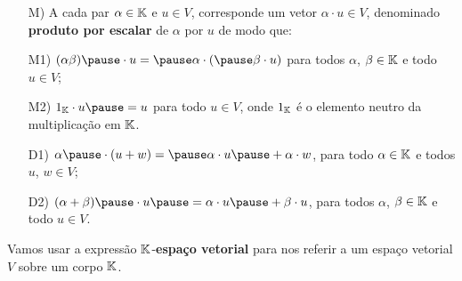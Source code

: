 \documentclass{beamer}
\begin{document}
\begin{frame}
  \begin{definicao}
    \begin{itemize}
      \item[M)] A cada par $\alpha \in \mathbb{K}$ \pause e $u \in V$, \pause corresponde um vetor $\alpha \cdot u \in V$, \pause denominado \textbf{produto por escalar} \pause de $\alpha$ por $u$ de modo que:\pause

        \vspace{.3cm}

      \item[M1)] $(\alpha\beta)\pause \cdot u = \pause \alpha\cdot (\pause \beta\cdot u)$ \pause para todos $\alpha$, $\beta \in \mathbb{K}$ \pause e todo $u \in V$;\pause

        \vspace{.3cm}

      \item[M2)] $1_\cp{K}\cdot u \pause = u$ \pause para todo $u \in V$, \pause onde $1_{\mathbb{K}}$ é o elemento neutro da multiplicação em $\mathbb{K}$.
    \end{itemize}
  \end{definicao}
\end{frame}

\begin{frame}
  \begin{definicao}
    \begin{itemize}
      \item[D1)] $\alpha\pause \cdot(u + w) = \pause \alpha\cdot u \pause + \alpha\cdot w$, \pause para todo $\alpha \in \mathbb{K}$ \pause e todos $u$, $w \in V$;\pause

        \vspace{.3cm}

      \item[D2)] $(\alpha + \beta)\pause \cdot u \pause = \alpha\cdot u \pause + \beta\cdot u$, \pause para todos $\alpha$, $\beta \in \mathbb{K}$ \pause e todo $u \in V$.
    \end{itemize}
  \end{definicao}
\end{frame}

\begin{frame}
  \begin{observacao}
    Vamos usar a expressão $\mathbb{K}$-\textbf{espaço vetorial} \pause para nos referir a um espaço vetorial $V$ sobre um corpo $\mathbb{K}$.
  \end{observacao}
\end{frame}
\end{document}
